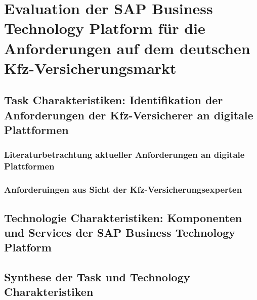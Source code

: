 \chapter{Evaluation der SAP Business Technology Platform für die Anforderungen auf dem deutschen Kfz-Versicherungsmarkt}

\section{Task Charakteristiken: Identifikation der Anforderungen der Kfz-Versicherer an digitale Plattformen}

\subsection{Literaturbetrachtung aktueller Anforderungen an digitale Plattformen}

\subsection{Anforderuingen aus Sicht der Kfz-Versicherungsexperten}

\section{Technologie Charakteristiken: Komponenten und Services der SAP Business Technology Platform}

\section{Synthese der Task und Technology Charakteristiken}


